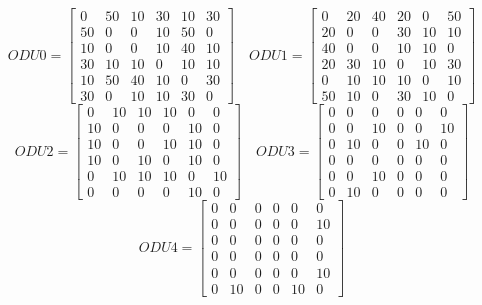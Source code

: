 \[
ODU0=
  \begin{bmatrix}
    0 & 50 & 10 & 30 & 10 & 30 \\
    50 & 0 & 0 & 10 & 50 & 0 \\
    10 & 0 & 0 & 10 & 40 & 10 \\
    30 & 10 & 10 & 0 & 10 & 10 \\
    10 & 50 & 40 & 10 & 0 & 30 \\
    30 & 0 & 10 & 10 & 30 & 0
  \end{bmatrix}
\quad ODU1=
  \begin{bmatrix}
    0 & 20 & 40 & 20 & 0 & 50 \\
    20 & 0 & 0 & 30 & 10 & 10 \\
    40 & 0 & 0 & 10 & 10 & 0 \\
    20 & 30 & 10 & 0 & 10 & 30 \\
    0 & 10 & 10 & 10 & 0 & 10 \\
    50 & 10 & 0 & 30 & 10 & 0
  \end{bmatrix}
\]
\[
ODU2=
  \begin{bmatrix}
    0 & 10 & 10 & 10 & 0 & 0 \\
    10 & 0 & 0 & 0 & 10 & 0 \\
    10 & 0 & 0 & 10 & 10 & 0 \\
    10 & 0 & 10 & 0 & 10 & 0 \\
    0 & 10 & 10 & 10 & 0 & 10 \\
    0 & 0 & 0 & 0 & 10 & 0
  \end{bmatrix}
\quad ODU3=
  \begin{bmatrix}
    0 & 0 & 0 & 0 & 0 & 0 \\
    0 & 0 & 10 & 0 & 0 & 10 \\
    0 & 10 & 0 & 0 & 10 & 0 \\
    0 & 0 & 0 & 0 & 0 & 0 \\
    0 & 0 & 10 & 0 & 0 & 0 \\
    0 & 10 & 0 & 0 & 0 & 0
  \end{bmatrix}
\]
\[
ODU4=
  \begin{bmatrix}
    0 & 0 & 0 & 0 & 0 & 0 \\
    0 & 0 & 0 & 0 & 0 & 10 \\
    0 & 0 & 0 & 0 & 0 & 0 \\
    0 & 0 & 0 & 0 & 0 & 0 \\
    0 & 0 & 0 & 0 & 0 & 10 \\
    0 & 10 & 0 & 0 & 10 & 0
  \end{bmatrix}
\]


